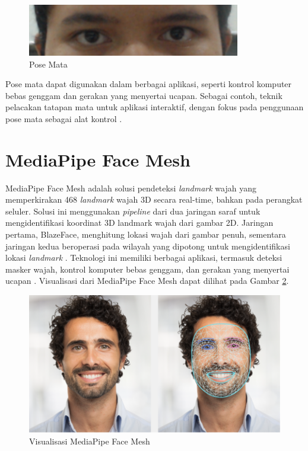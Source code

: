 \begin{figure} [ht] \centering
    \includegraphics[width=.45\textwidth]{gambar/bab3/gaze.png}
    \caption{Pose Mata}
    \label{fig:gaze}
\end{figure}

Pose mata dapat digunakan dalam berbagai aplikasi, seperti kontrol komputer bebas genggam  dan gerakan yang menyertai ucapan. Sebagai contoh, teknik pelacakan tatapan mata untuk aplikasi interaktif, dengan fokus pada penggunaan pose mata sebagai alat kontrol \parencite{Morimoto_Mimica_2005}. 

\section{MediaPipe Face Mesh}

MediaPipe Face Mesh adalah solusi pendeteksi \textit{landmark} wajah yang memperkirakan 468 \textit{landmark} wajah 3D secara real-time, bahkan pada perangkat seluler. Solusi ini menggunakan \textit{pipeline} dari dua jaringan saraf untuk mengidentifikasi koordinat 3D landmark wajah dari gambar 2D. Jaringan pertama, BlazeFace, menghitung lokasi wajah dari gambar penuh, sementara jaringan kedua beroperasi pada wilayah yang dipotong untuk mengidentifikasi lokasi \textit{landmark} \parencite{mediapipe_2020}. Teknologi ini memiliki berbagai aplikasi, termasuk deteksi masker wajah, kontrol komputer bebas genggam, dan gerakan yang menyertai ucapan \parencite{thaman_2022}. Visualisasi dari MediaPipe Face Mesh dapat dilihat pada Gambar \ref{fig:facemesh}.

\begin{figure} [ht] \centering
    \includegraphics[width=.45\textwidth]{gambar/face_landmark.png}
    \caption{Visualisasi MediaPipe Face Mesh}
    \label{fig:facemesh}
\end{figure}

